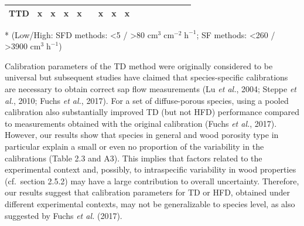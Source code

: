 \documentclass[11pt,twoside]{reedthesis}
\begin{document}
\begin{table}[!h]
\begin{threeparttable}
\begin{tabular}[t]{cccccccccccccccc}
TTD & x & x & x & x &  & x & x & x &  & \multicolumn{1}{c}{\cellcolor[HTML]{FFFFFF}{\textcolor[HTML]{FFFFFF}{0}}} & \multicolumn{1}{c}{\cellcolor[HTML]{FFFFFF}{\textcolor[HTML]{FFFFFF}{0}}} & \multicolumn{1}{c}{\cellcolor[HTML]{BBBBBB}{\textcolor[HTML]{BBBBBB}{1}}} & \multicolumn{1}{c}{\cellcolor[HTML]{FFFFFF}{\textcolor[HTML]{FFFFFF}{0}}} & \multicolumn{1}{c}{\cellcolor[HTML]{999999}{\textcolor[HTML]{999999}{2}}} & \multicolumn{1}{c}{\cellcolor[HTML]{FFFFFF}{\textcolor[HTML]{FFFFFF}{0}}}\\
\bottomrule
\end{tabular}
\begin{tablenotes}
\small
\item [*] (Low/High: SFD methods: <5 / >80 $\text{cm}^{3}\; \text{cm}^{-2}\; \text{h}^{-1}$; SF methods: <260 / >3900 $\text{cm}^3\; \text{h}^{-1}$)
\end{tablenotes}
\end{threeparttable}
\end{table}
Calibration parameters of the TD method were originally considered to be
universal but subsequent studies have claimed that species-specific
calibrations are necessary to obtain correct sap flow measurements (Lu
\emph{et al.}, 2004; Steppe \emph{et al.}, 2010; Fuchs \emph{et al.},
2017). For a set of diffuse-porous species, using a pooled calibration
also substantially improved TD (but not HFD) performance compared to
measurements obtained with the original calibration (Fuchs \emph{et
al.}, 2017). However, our results show that species in general and wood
porosity type in particular explain a small or even no proportion of the
variability in the calibrations (Table 2.3 and A3). This implies that
factors related to the experimental context and, possibly, to
intraspecific variability in wood properties (cf.~section 2.5.2) may
have a large contribution to overall uncertainty. Therefore, our results
suggest that calibration parameters for TD or HFD, obtained under
different experimental contexts, may not be generalizable to species
level, as also suggested by Fuchs \emph{et al.} (2017).\par
\end{document}
